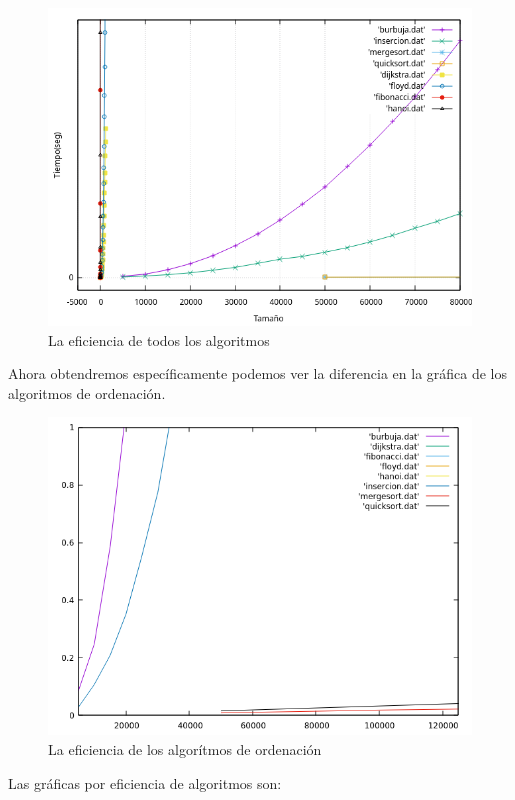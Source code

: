 \documentclass[12pt, spanish]{article}
\begin{document}
\begin{figure}[H]
  \centering
  \includegraphics[scale = 1]{TodosAlgoritmos.png}
  \caption{La eficiencia de todos los algoritmos}
\end{figure}


Ahora obtendremos específicamente podemos ver la diferencia en la gráfica de los algoritmos de ordenación.

\begin{figure}[H]
  \centering
  \includegraphics[scale = 0.7]{AlgoritmosOrdenacion.png}
  \caption{La eficiencia de los algorítmos de ordenación}
\end{figure}

Las gráficas por eficiencia de algoritmos son:
\end{document}
